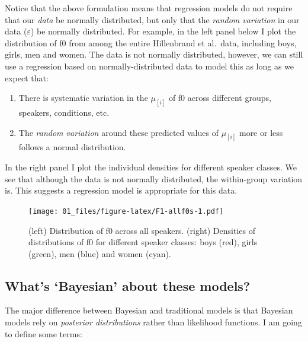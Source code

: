 \documentclass[
]{book}
\begin{document}
Notice that the above formulation means that regression models do not require that our \emph{data} be normally distributed, but only that the \emph{random variation} in our data (\(\varepsilon\)) be normally distributed. For example, in the left panel below I plot the distribution of f0 from among the entire Hillenbrand et al.~data, including boys, girls, men and women. The data is not normally distributed, however, we can still use a regression based on normally-distributed data to model this as long as we expect that:

\begin{enumerate}
\def\labelenumi{\arabic{enumi})}
\item
  There is systematic variation in the \(\mu_{[i]}\) of f0 across different groups, speakers, conditions, etc.
\item
  The \emph{random variation} around these predicted values of \(\mu_{[i]}\) more or less follows a normal distribution.
\end{enumerate}

In the right panel I plot the individual densities for different speaker classes. We see that although the data is not normally distributed, the within-group variation is. This suggests a regression model is appropriate for this data.

\begin{figure}
\centering
\texttt{[image: 01\_files/figure-latex/F1-allf0s-1.pdf]}
\caption{\label{fig:F1-allf0s}(left) Distribution of f0 across all speakers. (right) Densities of distributions of f0 for different speaker classes: boys (red), girls (green), men (blue) and women (cyan).}
\end{figure}

\hypertarget{whats-bayesian-about-these-models}{%
\subsection{What's `Bayesian' about these models?}\label{whats-bayesian-about-these-models}}

The major difference between Bayesian and traditional models is that Bayesian models rely on \emph{posterior distributions} rather than likelihood functions. I am going to define some terms:
\end{document}
